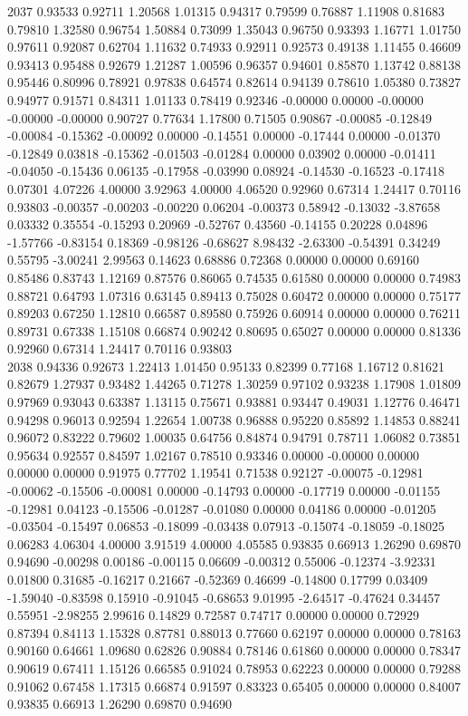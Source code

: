 {2037 0.93533 0.92711 1.20568 1.01315 0.94317 0.79599 0.76887 1.11908 0.81683 0.79810 1.32580 0.96754 1.50884 0.73099 1.35043 0.96750 0.93393 1.16771 1.01750 0.97611 0.92087 0.62704 1.11632 0.74933 0.92911 0.92573 0.49138 1.11455 0.46609 0.93413 0.95488 0.92679 1.21287 1.00596 0.96357 0.94601 0.85870 1.13742 0.88138 0.95446 0.80996 0.78921 0.97838 0.64574 0.82614 0.94139 0.78610 1.05380 0.73827 0.94977 0.91571 0.84311 1.01133 0.78419 0.92346 -0.00000 0.00000 -0.00000 -0.00000 -0.00000 0.90727 0.77634 1.17800 0.71505 0.90867 -0.00085 -0.12849 -0.00084 -0.15362 -0.00092 0.00000 -0.14551 0.00000 -0.17444 0.00000 -0.01370 -0.12849 0.03818 -0.15362 -0.01503 -0.01284 0.00000 0.03902 0.00000 -0.01411 -0.04050 -0.15436 0.06135 -0.17958 -0.03990 0.08924 -0.14530 -0.16523 -0.17418 0.07301 4.07226 4.00000 3.92963 4.00000 4.06520 0.92960 0.67314 1.24417 0.70116 0.93803 -0.00357 -0.00203 -0.00220 0.06204 -0.00373 0.58942 -0.13032 -3.87658 0.03332 0.35554 -0.15293 0.20969 -0.52767 0.43560 -0.14155 0.20228 0.04896 -1.57766 -0.83154 0.18369 -0.98126 -0.68627 8.98432 -2.63300 -0.54391 0.34249 0.55795 -3.00241 2.99563 0.14623 0.68886 0.72368 0.00000 0.00000 0.69160 0.85486 0.83743 1.12169 0.87576 0.86065 0.74535 0.61580 0.00000 0.00000 0.74983 0.88721 0.64793 1.07316 0.63145 0.89413 0.75028 0.60472 0.00000 0.00000 0.75177 0.89203 0.67250 1.12810 0.66587 0.89580 0.75926 0.60914 0.00000 0.00000 0.76211 0.89731 0.67338 1.15108 0.66874 0.90242 0.80695 0.65027 0.00000 0.00000 0.81336 0.92960 0.67314 1.24417 0.70116 0.93803 \\
2038 0.94336 0.92673 1.22413 1.01450 0.95133 0.82399 0.77168 1.16712 0.81621 0.82679 1.27937 0.93482 1.44265 0.71278 1.30259 0.97102 0.93238 1.17908 1.01809 0.97969 0.93043 0.63387 1.13115 0.75671 0.93881 0.93447 0.49031 1.12776 0.46471 0.94298 0.96013 0.92594 1.22654 1.00738 0.96888 0.95220 0.85892 1.14853 0.88241 0.96072 0.83222 0.79602 1.00035 0.64756 0.84874 0.94791 0.78711 1.06082 0.73851 0.95634 0.92557 0.84597 1.02167 0.78510 0.93346 0.00000 -0.00000 0.00000 0.00000 0.00000 0.91975 0.77702 1.19541 0.71538 0.92127 -0.00075 -0.12981 -0.00062 -0.15506 -0.00081 0.00000 -0.14793 0.00000 -0.17719 0.00000 -0.01155 -0.12981 0.04123 -0.15506 -0.01287 -0.01080 0.00000 0.04186 0.00000 -0.01205 -0.03504 -0.15497 0.06853 -0.18099 -0.03438 0.07913 -0.15074 -0.18059 -0.18025 0.06283 4.06304 4.00000 3.91519 4.00000 4.05585 0.93835 0.66913 1.26290 0.69870 0.94690 -0.00298 0.00186 -0.00115 0.06609 -0.00312 0.55006 -0.12374 -3.92331 0.01800 0.31685 -0.16217 0.21667 -0.52369 0.46699 -0.14800 0.17799 0.03409 -1.59040 -0.83598 0.15910 -0.91045 -0.68653 9.01995 -2.64517 -0.47624 0.34457 0.55951 -2.98255 2.99616 0.14829 0.72587 0.74717 0.00000 0.00000 0.72929 0.87394 0.84113 1.15328 0.87781 0.88013 0.77660 0.62197 0.00000 0.00000 0.78163 0.90160 0.64661 1.09680 0.62826 0.90884 0.78146 0.61860 0.00000 0.00000 0.78347 0.90619 0.67411 1.15126 0.66585 0.91024 0.78953 0.62223 0.00000 0.00000 0.79288 0.91062 0.67458 1.17315 0.66874 0.91597 0.83323 0.65405 0.00000 0.00000 0.84007 0.93835 0.66913 1.26290 0.69870 0.94690 \\
}
